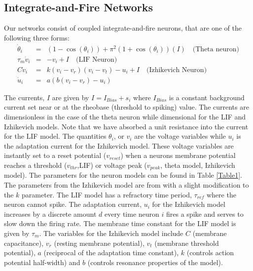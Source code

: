 \documentclass[11pt]{article} %
\begin{document}
\subsection*{Integrate-and-Fire Networks} 
Our networks consist of coupled integrate-and-fire neurons, 
that are one of the following three forms: 
\begin{eqnarray}
\dot{\theta}_i &=& (1-\cos(\theta_i)) +\pi^2 (1+\cos(\theta_i))( I)  \quad \text{(Theta neuron)}\\
\tau_m\dot{v}_i &=& -v_i + I  \quad \text{(LIF Neuron)} \\
C\dot{v}_i &=& k(v_i-v_r)(v_i-v_t) - u_i +I  \quad \text{(Izhikevich Neuron)} \\
\dot{u}_i &=& a(b(v_i -v_r) - u_i) 
\end{eqnarray}

The currents, $I$ are given by $I=I_{Bias}+ s_i$ where $I_{Bias}$ is a constant background current 
set near or at the rheobase (threshold to spiking) value.   
The currents are dimensionless in the case of the theta neuron while dimensional for the LIF and Izhikevich models.  
Note that we have absorbed a unit resistance into the current for the LIF model.   
The quantities $\theta_i$, or $v_i$ are the voltage variables while $u_i$ is the 
adaptation current for the Izhikevich model.  
These voltage variables are instantly set to a reset potential ($v_{reset}$) when a 
neurons membrane potential reaches a threshold ($v_{thr}$,LIF) or voltage peak 
($v_{peak}$, theta model, Izhikevich model).  The parameters for the neuron models 
can be found in Table \ref{Table1}.  The parameters from the Izhikevich model are from \cite{ahmad} 
with a slight modification to the $k$ parameter.  The LIF model has a refractory time period, 
$\tau_{ref}$ where the neuron cannot spike.      
The adaptation current, $u_i$ for the Izhikevich model increases by a discrete amount 
$d$ every time neuron $i$ fires a spike and serves to slow down the firing rate.  
The membrane time constant for the LIF model is given by $\tau_m$.  
The variables for the Izhikevich model include $C$ (membrane capacitance), 
$v_r$ (resting membrane potential), $v_t$ (membrane threshold potential), 
$a$ (reciprocal of the adaptation time constant), 
$k$ (controls action potential half-width) and $b$ (controls resonance properties of the model).  
\end{document}
